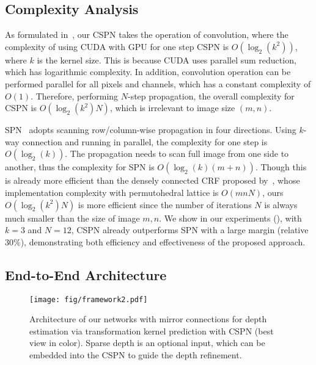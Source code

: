 

\subsection{Complexity Analysis}
\label{subsec:time}

As formulated in~, our CSPN takes the operation of convolution, where the complexity of using CUDA with GPU for one step CSPN is $O(\log_2(k^2))$, where $k$ is the kernel size. This is because CUDA uses parallel sum reduction, which has logarithmic complexity. In addition,  convolution operation can be performed parallel for all pixels and channels, which has a constant complexity of $O(1)$. Therefore, performing $N$-step propagation, the overall complexity for CSPN is $O(\log_2(k^2)N)$, which is irrelevant to image size $(m, n)$.

SPN~\cite{liu2017learning} adopts scanning row/column-wise propagation in four directions. Using $k$-way connection and running in parallel, the complexity for one step is $O(\log_2(k))$. The propagation needs to scan full image from one side to another, thus the complexity for SPN is $O(\log_2(k)(m + n))$. Though this is already more efficient than the densely connected CRF proposed by~\cite{philipp2012dense}, whose implementation complexity with permutohedral lattice is $O(mnN)$, ours $O(\log_2(k^2)N)$ is more efficient since the number of iterations $N$ is always much smaller than the size of image $m, n$. We show in our experiments (), with $k=3$ and $N=12$, CSPN already outperforms SPN with a large margin (relative $30\%$), demonstrating both efficiency and effectiveness of the proposed approach.


\subsection{End-to-End Architecture}
\label{subsec:unet}
\begin{figure}[t]
\centering
\texttt{[image: fig/framework2.pdf]}
\caption{Architecture of our networks with mirror connections for  depth estimation via transformation kernel prediction with CSPN (best view in color). Sparse depth is an optional input, which can be embedded into the CSPN to guide the depth refinement.}
\label{fig:arch}
\end{figure}

